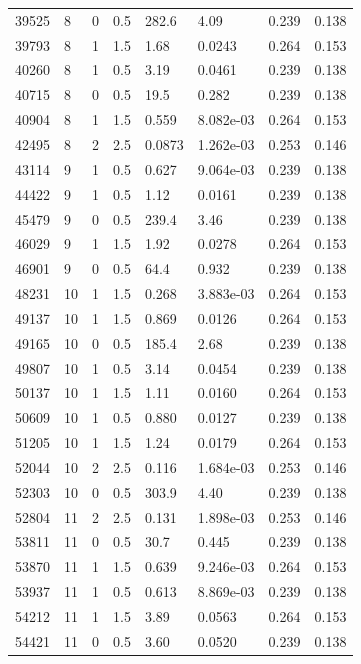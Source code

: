 \documentclass[preview]{standalone}
\begin{document}
{{{\begin{tabular}{L{1.2cm}C{1.2cm} C{0.3cm}C{0.5cm} C{1.4cm}C{1.4cm} C{1.4cm}C{1.4cm}}
  39525  &     8  & 0     & 0.5 &  282.6  & 4.09  & 0.239 &  0.138   \\ 
  39793  &     8  & 1     & 1.5 &  1.68  & 0.0243  & 0.264 &  0.153   \\ 
  40260  &     8  & 1     & 0.5 &  3.19  & 0.0461  & 0.239 &  0.138   \\ 
  40715  &     8  & 0     & 0.5 &  19.5  & 0.282  & 0.239 &  0.138   \\ 
  40904  &     8  & 1     & 1.5 &  0.559  & 8.082e-03  & 0.264 &  0.153   \\ 
  42495  &     8  & 2     & 2.5 &  0.0873  & 1.262e-03  & 0.253 &  0.146   \\ 
  43114  &     9  & 1     & 0.5 &  0.627  & 9.064e-03  & 0.239 &  0.138   \\ 
  44422  &     9  & 1     & 0.5 &  1.12  & 0.0161  & 0.239 &  0.138   \\ 
  45479  &     9  & 0     & 0.5 &  239.4  & 3.46  & 0.239 &  0.138   \\ 
  46029  &     9  & 1     & 1.5 &  1.92  & 0.0278  & 0.264 &  0.153   \\ 
  46901  &     9  & 0     & 0.5 &  64.4  & 0.932  & 0.239 &  0.138   \\ 
  48231  &    10  & 1     & 1.5 &  0.268  & 3.883e-03  & 0.264 &  0.153   \\ 
  49137  &    10  & 1     & 1.5 &  0.869  & 0.0126  & 0.264 &  0.153   \\ 
  49165  &    10  & 0     & 0.5 &  185.4  & 2.68  & 0.239 &  0.138   \\ 
  49807  &    10  & 1     & 0.5 &  3.14  & 0.0454  & 0.239 &  0.138   \\ 
  50137  &    10  & 1     & 1.5 &  1.11  & 0.0160  & 0.264 &  0.153   \\ 
  50609  &    10  & 1     & 0.5 &  0.880  & 0.0127  & 0.239 &  0.138   \\ 
  51205  &    10  & 1     & 1.5 &  1.24  & 0.0179  & 0.264 &  0.153   \\ 
  52044  &    10  & 2     & 2.5 &  0.116  & 1.684e-03  & 0.253 &  0.146   \\ 
  52303  &    10  & 0     & 0.5 &  303.9  & 4.40  & 0.239 &  0.138   \\ 
  52804  &    11  & 2     & 2.5 &  0.131  & 1.898e-03  & 0.253 &  0.146   \\ 
  53811  &    11  & 0     & 0.5 &  30.7  & 0.445  & 0.239 &  0.138   \\ 
  53870  &    11  & 1     & 1.5 &  0.639  & 9.246e-03  & 0.264 &  0.153   \\ 
  53937  &    11  & 1     & 0.5 &  0.613  & 8.869e-03  & 0.239 &  0.138   \\ 
  54212  &    11  & 1     & 1.5 &  3.89  & 0.0563  & 0.264 &  0.153   \\ 
  54421  &    11  & 0     & 0.5 &  3.60  & 0.0520  & 0.239 &  0.138   \\ 
\hline 
\end{tabular} 

}}}
\end{document}

